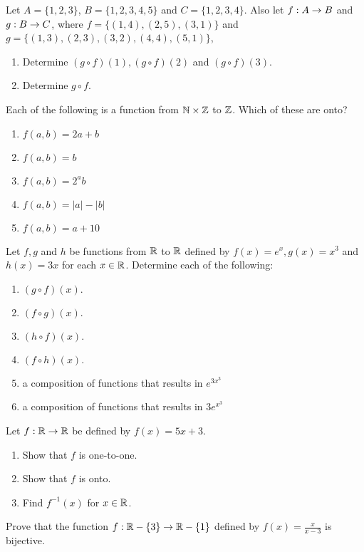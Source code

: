 \documentclass{homework}
\begin{document}
\question Let $A = \{1, 2, 3\}$, $B = \{1, 2, 3, 4, 5\}$ and $C = \{1, 2, 3, 4\}$. Also let $f : A \rightarrow B$ and $g : B \rightarrow C$, where $f = \{(1, 4), (2, 5), (3, 1)\}$ and $g = \{(1, 3), (2, 3), (3, 2), (4, 4), (5, 1)\}$,
\begin{enumerate}[label=(\alph*)]
    \item Determine $(g \circ f )(1), (g \circ f )(2)$ and $(g \circ f )(3)$.
    \item Determine $g \circ f$.
\end{enumerate}

\question Each of the following is a function from $\mathbb{N} \times \mathbb{Z}$ to $\mathbb{Z}$. Which of these are onto?
\begin{enumerate}[label=(\alph*)]
    \item $f(a, b) = 2a + b$
    \item $f(a, b) = b$
    \item $f(a, b) = 2^ab$
    \item $f(a, b) = |a|-|b|$
    \item $f(a, b) = a+10$
\end{enumerate}

\question Let $f, g$ and $h$ be functions from $\mathbb{R}$ to $\mathbb{R}$ deﬁned by $f(x) = e^x, g(x) = x^3$ and $h(x) = 3x$ for each $x \in \mathbb{R}$. Determine each of the following:
\begin{enumerate}[label=(\alph*)]
    \item $(g \circ f )(x).$
    \item $(f \circ g)(x).$
    \item $(h \circ f )(x).$
    \item $(f \circ h)(x).$
    \item a composition of functions that results in $e^{3x^3}$
    \item a composition of functions that results in $3e^{x^3}$
\end{enumerate}

\question Let $f: \mathbb{R} \rightarrow \mathbb{R}$ be deﬁned by $f(x) = 5x + 3$.
\begin{enumerate}
    \item Show that $f$ is one-to-one.
    \item Show that $f$ is onto.
    \item Find $f^{-1}(x)$ for $x \in \mathbb{R}$.
\end{enumerate}

\question Prove that the function $f:\mathbb{R}-\{3\} \rightarrow \mathbb{R} - \{1\}$ deﬁned by $f(x)=\frac{x}{x-3}$ is bijective.

\end{document}
